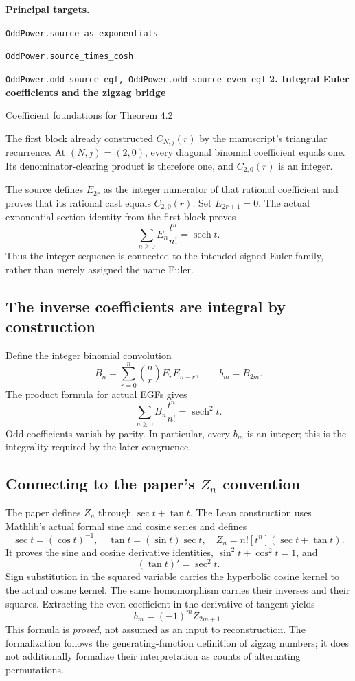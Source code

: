 \documentclass[11pt]{article}
\newcommand{\target}[1]{{\footnotesize\texttt{#1}}}
\newcommand{\pageheading}[2]{{\Large\bfseries\color{ink}#1}\par{\small #2}\par\medskip}
\newcommand{\sech}{\operatorname{sech}}
\begin{document}
\textbf{Principal targets.}\par
\target{OddPower.source\_as\_exponentials}\par
\target{OddPower.source\_times\_cosh}\par
\target{OddPower.odd\_source\_egf, OddPower.odd\_source\_even\_egf}
\newpage
\pageheading{2. Integral Euler coefficients and the zigzag bridge}{Coefficient foundations for Theorem 4.2}
The first block already constructed $C_{N,j}(r)$ by the manuscript's triangular recurrence. At $(N,j)=(2,0)$, every diagonal binomial coefficient equals one. Its denominator-clearing product is therefore one, and $C_{2,0}(r)$ is an integer.

The source defines $E_{2r}$ as the integer numerator of that rational coefficient and proves that its rational cast equals $C_{2,0}(r)$. Set $E_{2r+1}=0$. The actual exponential-section identity from the first block proves
\[
 \boxed{\sum_{n\ge0}E_n\frac{t^n}{n!}=\sech t.}
\]
Thus the integer sequence is connected to the intended signed Euler family, rather than merely assigned the name Euler.

\subsection*{The inverse coefficients are integral by construction}
Define the integer binomial convolution
\[
 B_n=\sum_{r=0}^{n}\binom nr E_rE_{n-r},\qquad b_m=B_{2m}.
\]
The product formula for actual EGFs gives
\[
 \sum_{n\ge0}B_n\frac{t^n}{n!}=\sech^2 t.
\]
Odd coefficients vanish by parity. In particular, every $b_m$ is an integer; this is the integrality required by the later congruence.

\subsection*{Connecting to the paper's $Z_n$ convention}
The paper defines $Z_n$ through $\sec t+\tan t$. The Lean construction uses Mathlib's actual formal sine and cosine series and defines
\[
 \sec t=(\cos t)^{-1},\quad \tan t=(\sin t)\sec t,
 \quad Z_n=n![t^n](\sec t+\tan t).
\]
It proves the sine and cosine derivative identities, $\sin^2t+\cos^2t=1$, and
\[
 (\tan t)'=\sec^2t.
\]
Sign substitution in the squared variable carries the hyperbolic cosine kernel to the actual cosine kernel. The same homomorphism carries their inverses and their squares. Extracting the even coefficient in the derivative of tangent yields
\[
 \boxed{b_m=(-1)^m Z_{2m+1}.}
\]
This formula is \emph{proved}, not assumed as an input to reconstruction. The formalization follows the generating-function definition of zigzag numbers; it does not additionally formalize their interpretation as counts of alternating permutations.
\end{document}
